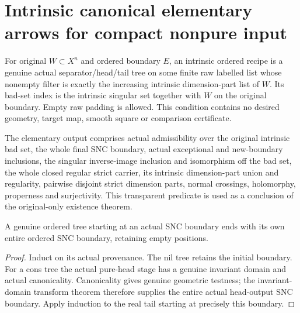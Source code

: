 \section{Intrinsic canonical elementary arrows for compact nonpure input}

\begin{definition}
\label{hir:original-intrinsic-ordered-recipe}
\leanok
For original $W\subset X^n$ and ordered boundary $E$, an intrinsic
ordered recipe is a genuine actual separator/head/tail tree on some
finite raw labelled list whose nonempty filter is exactly the
increasing intrinsic dimension-part list of $W$. Its bad-set index is
the intrinsic singular set together with $W$ on the original boundary.
Empty raw padding is allowed. This condition contains no desired
geometry, target map, smooth square or comparison certificate.
\end{definition}

\begin{definition}
\label{hir:original-intrinsic-elementary-geometry-output}
\leanok
The elementary output comprises actual admissibility over the original
intrinsic bad set, the whole final SNC boundary, actual exceptional and
new-boundary inclusions, the singular inverse-image inclusion and
isomorphism off the bad set, the whole closed regular strict carrier,
its intrinsic dimension-part union and regularity, pairwise disjoint
strict dimension parts, normal crossings, holomorphy, properness and
surjectivity. This transparent predicate is used as a conclusion of the
original-only existence theorem.
\end{definition}

\begin{lemma}
\label{hir:original-ordered-tree-own-snc}
\leanok
A genuine ordered tree starting at an actual SNC boundary ends with
its own entire ordered SNC boundary, retaining empty positions.
\end{lemma}
\begin{proof}
Induct on its actual provenance. The nil tree retains the initial
boundary. For a cons tree the actual pure-head stage has a genuine
invariant domain and actual canonicality. Canonicality gives genuine
geometric testness; the invariant-domain transform theorem therefore
supplies the entire actual head-output SNC boundary. Apply induction
to the real tail starting at precisely this boundary.
\end{proof}

